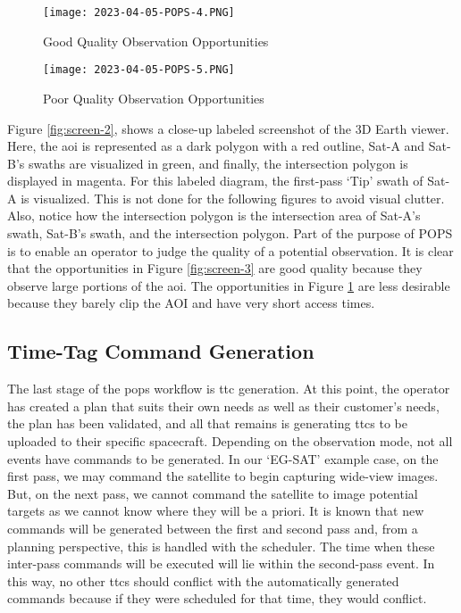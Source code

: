 \begin{figure}[h] 
    \centering
    \texttt{[image: 2023-04-05-POPS-4.PNG]} 
    \caption{Good Quality Observation Opportunities}
    \label{fig:screen-3} 

    \texttt{[image: 2023-04-05-POPS-5.PNG]} 
    \caption{Poor Quality Observation Opportunities}
    \label{fig:screen-4} 
\end{figure}


Figure \ref{fig:screen-2}, shows a close-up labeled screenshot of the 3D Earth
viewer.  Here, the \gls{aoi} is represented as a dark polygon with a red
outline, Sat-A and Sat-B’s swaths are visualized in green, and finally, the
intersection polygon is displayed in magenta. For this labeled diagram, the
first-pass ‘Tip’ swath of Sat-A is visualized. This is not done for the
following figures to avoid visual clutter. Also, notice how the intersection
polygon is the intersection area of Sat-A’s swath, Sat-B’s swath, and the
intersection polygon. Part of the purpose of POPS is to enable an operator to
judge the quality of a potential observation. It is clear that the
opportunities in Figure \ref{fig:screen-3} are good quality because they
observe large portions of the \gls{aoi}. The opportunities in Figure
\ref{fig:screen-4} are less desirable because they barely clip the AOI and have
very short access times.


\subsection{Time-Tag Command Generation}

The last stage of the \gls{pops} workflow is \gls{ttc} generation.  At this
point, the operator has created a plan that suits their own needs as well as
their customer’s needs, the plan has been validated, and all that remains is
generating \glspl{ttc} to be uploaded to their specific spacecraft.  Depending
on the observation mode, not all events have commands to be generated. In our
‘EG-SAT’ example case, on the first pass, we may command the satellite to begin
capturing wide-view images. But, on the next pass, we cannot command the
satellite to image potential targets as we cannot know where they will be a
priori. It is known that new commands will be generated between the first and
second pass and, from a planning perspective, this is handled with the
scheduler. The time when these inter-pass commands will be executed will lie
within the second-pass event. In this way, no other \glspl{ttc} should conflict
with the automatically generated commands because if they were scheduled for
that time, they would conflict. 

